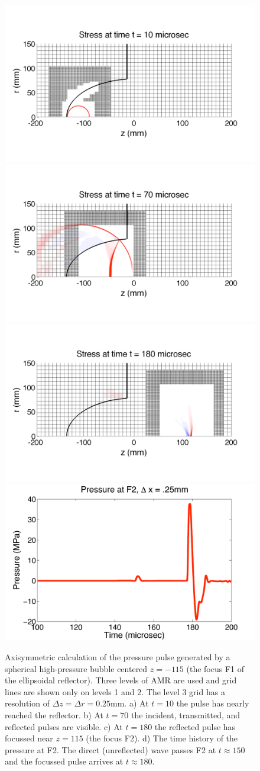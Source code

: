 \documentclass{article}
\begin{document}
\begin{figure}[h!]
\begin{center}
\includegraphics[width=.45\textwidth]{amr_stress10_rwb.pdf}
\includegraphics[width=.45\textwidth]{amr_stress70_rwb.pdf}\vspace{1mm}
\includegraphics[width=.45\textwidth]{amr_stress180_rwb.pdf}
\includegraphics[width=.45\textwidth]{amr_25_pressure.pdf}
\caption{
\label{fig:amr_interface}
Axisymmetric calculation of the pressure pulse generated by a spherical high-pressure bubble
centered $z=-115$ (the focus F1 of the ellipsoidal reflector). Three levels of AMR are used and
grid lines are shown only on levels 1 and 2. The level 3 grid has a resolution of $\Delta z =
\Delta r = 0.25$mm. a) At $t=10$ the pulse has nearly reached the reflector. b) At $t=70$ the
incident, transmitted, and reflected pulses are visible. c) At $t=180$ the reflected pulse has
focussed near $z=115$ (the focus F2). d) The time history of the pressure at F2. The direct
(unreflected) wave passes F2 at $t\approx 150$ and the focussed pulse arrives at $t\approx 180$.}
\end{center}
\end{figure}
\clearpage
\end{document}
